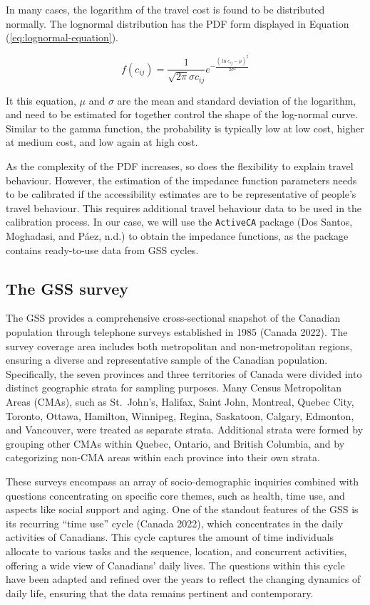 \documentclass[preprint, 3p,
authoryear]{elsarticle} %
\begin{document}
In many cases, the logarithm of the travel cost is found to be
distributed normally. The lognormal distribution has the PDF form
displayed in Equation (\ref{eq:lognormal-equation}).

\begin{equation}
f(c_{ij}) = \frac{1}{\sqrt{2\pi} \sigma c_{ij}} e^{-\frac{(\ln c_{ij} - \mu)^2}{2\sigma^2}}
\label{eq:lognormal-equation}
\end{equation}

It this equation, \(\mu\) and \(\sigma\) are the mean and standard
deviation of the logarithm, and need to be estimated for together
control the shape of the log-normal curve. Similar to the gamma
function, the probability is typically low at low cost, higher at medium
cost, and low again at high cost.

As the complexity of the PDF increases, so does the flexibility to
explain travel behaviour. However, the estimation of the impedance
function parameters needs to be calibrated if the accessibility
estimates are to be representative of people's travel behaviour. This
requires additional travel behaviour data to be used in the calibration
process. In our case, we will use the \texttt{ActiveCA} package (Dos
Santos, Moghadasi, and Páez, n.d.) to obtain the impedance functions, as
the package contains ready-to-use data from GSS cycles.

\hypertarget{the-gss-survey}{%
\subsection{The GSS survey}\label{the-gss-survey}}

The GSS provides a comprehensive cross-sectional snapshot of the
Canadian population through telephone surveys established in 1985
(Canada 2022). The survey coverage area includes both metropolitan and
non-metropolitan regions, ensuring a diverse and representative sample
of the Canadian population. Specifically, the seven provinces and three
territories of Canada were divided into distinct geographic strata for
sampling purposes. Many Census Metropolitan Areas (CMAs), such as
St.~John's, Halifax, Saint John, Montreal, Quebec City, Toronto, Ottawa,
Hamilton, Winnipeg, Regina, Saskatoon, Calgary, Edmonton, and Vancouver,
were treated as separate strata. Additional strata were formed by
grouping other CMAs within Quebec, Ontario, and British Columbia, and by
categorizing non-CMA areas within each province into their own strata.

These surveys encompass an array of socio-demographic inquiries combined
with questions concentrating on specific core themes, such as health,
time use, and aspects like social support and aging. One of the standout
features of the GSS is its recurring ``time use'' cycle (Canada 2022),
which concentrates in the daily activities of Canadians. This cycle
captures the amount of time individuals allocate to various tasks and
the sequence, location, and concurrent activities, offering a wide view
of Canadians' daily lives. The questions within this cycle have been
adapted and refined over the years to reflect the changing dynamics of
daily life, ensuring that the data remains pertinent and contemporary.
\end{document}
